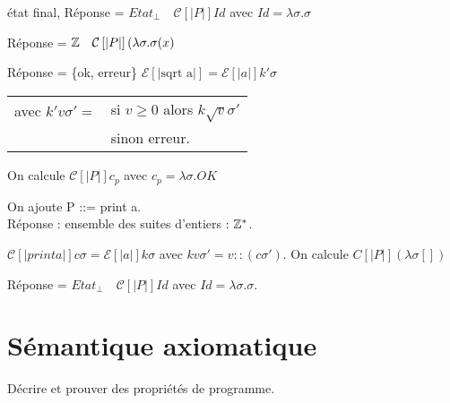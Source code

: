 \documentclass[10pt,a4paper]{article}
\newcommand{\E}{\mathcal{E}}
\newcommand{\semm}[1]{\left[| #1 | \right]}
\begin{document}
\begin{ex}[1] état final, Réponse = $Etat_{\perp} \quad \mathcal{C}\semm{P} Id$ avec $Id = \lambda \sigma . \sigma$
\end{ex}
\begin{ex}[2]  Réponse = $\Zs \quad \mathcal{C}\semm{P} ( \lambda \sigma . \sigma(x)$
\end{ex}
\begin{ex}[3]  Réponse = \{ok, erreur\} $\E\semm{\text{sqrt a}} = \E\semm{a} k' \sigma$ \\
\begin{tabular}{ll}
 avec $k' v \sigma' = $ & si $v \geq 0$ alors $ k \sqrt{v} \sigma'$\\
  & sinon erreur.\\
\end{tabular}
On calcule $\mathcal{C}\semm{P} c_p$ avec $c_p = \lambda \sigma . OK$
\end{ex}
\begin{ex}[4 : affichage] On ajoute P ::= print a.\\
Réponse : ensemble des suites d'entiers : $\mathbb{Z}^*$.

$\mathcal{C}\semm{print a} c \sigma = \E\semm{a} k \sigma$ avec $k v \sigma' = v::(c \sigma')$.
On calcule ${C}\semm{P} (\lambda \sigma [])$

 Réponse = $Etat_{\perp} \quad \mathcal{C}\semm{P} Id$ avec $Id = \lambda \sigma . \sigma$.
\end{ex}



\part{Sémantique axiomatique}

Décrire et prouver des propriétés de programme.
\end{document}
